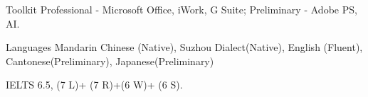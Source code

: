 \begin{cvskills}
  	\cvskill
    {Toolkit}
    {Professional - Microsoft Office, iWork, G Suite; Preliminary -  Adobe PS, AI.}
    
  	\cvskill
    {Languages}
    {Mandarin Chinese (Native), Suzhou Dialect(Native), English (Fluent), Cantonese(Preliminary), Japanese(Preliminary)}

	\cvskill
 	{IELTS}
  	{6.5, (7 L)+ (7 R)+(6 W)+ (6 S).}
   
\end{cvskills}


